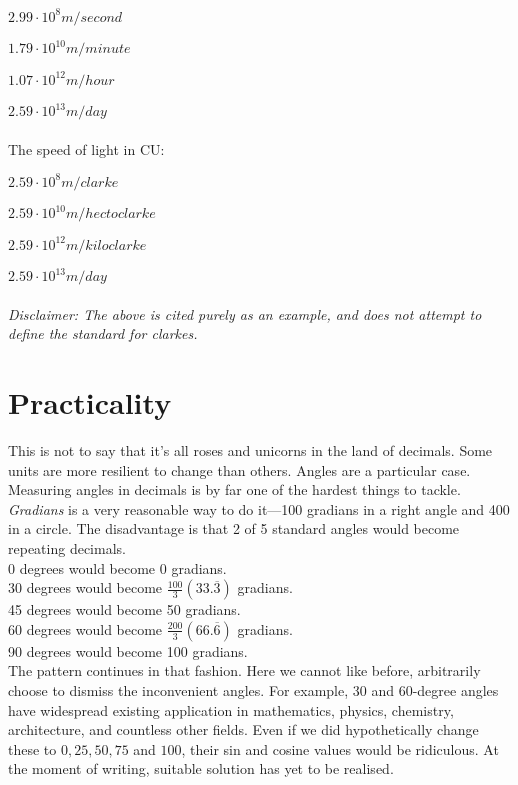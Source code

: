 \(2.99\cdot10^8 m/second\)

\(1.79\cdot10^{10}m/minute\)

\(1.07\cdot10^{12}m/hour\)

\(2.59\cdot10^{13}m/day\)
\\~\\
The speed of light in CU\@:

\(2.59\cdot10^8 m/clarke\)

\(2.59\cdot10^{10} m/hectoclarke\)

\(2.59\cdot10^{12} m/kiloclarke\)

\(2.59\cdot10^{13} m/day\)
\\~\\
\textit{Disclaimer: The above is cited purely as an example, and does not attempt to define the standard for clarkes.}

\section{Practicality}
This is not to say that it's all roses and unicorns in the land of decimals.
Some units are more resilient to change than others.
Angles are a particular case. Measuring angles in decimals is by far one of the hardest things to tackle.
\textit{Gradians} is a very reasonable way to do it—100 gradians in a right angle and 400 in a circle. The disadvantage is that 2 of 5 standard angles would become repeating decimals.\\
0 degrees would become 0 gradians.\\
30 degrees would become \(\frac{100}{3}(33.\overline{3})\) gradians.\\
45 degrees would become 50 gradians.\\
60 degrees would become \(\frac{200}{3}(66.\overline{6})\) gradians.\\
90 degrees would become 100 gradians.\\
The pattern continues in that fashion.
Here we cannot like before, arbitrarily choose to dismiss the inconvenient angles.
For example, 30 and 60-degree angles have widespread existing application in mathematics, physics, chemistry, architecture, and countless other fields.
Even if we did hypothetically change these to \(0,25,50,75\) and \(100\), their sin and cosine values would be ridiculous.
At the moment of writing, suitable solution has yet to be realised.
